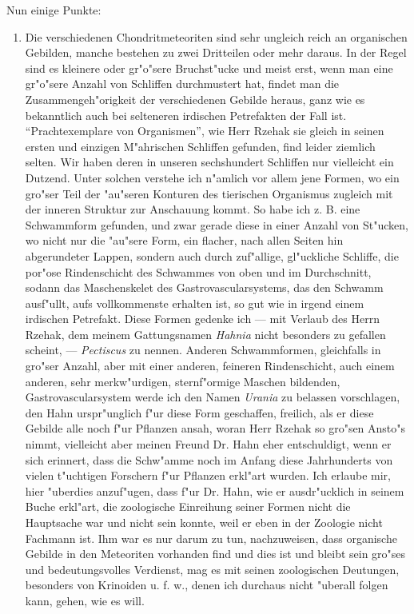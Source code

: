 \documentclass[a4paper, 12pt, oneside]{article}
\begin{document}
Nun einige Punkte:
\begin{enumerate}
    \item Die verschiedenen Chondritmeteoriten sind sehr ungleich reich an organischen Gebilden, manche bestehen zu zwei Dritteilen oder mehr daraus. In der Regel sind es kleinere oder gr"o"sere Bruchst"ucke und meist erst, wenn man eine gr"o"sere Anzahl von Schliffen durchmustert hat, findet man die Zusammengeh"origkeit der verschiedenen Gebilde heraus, ganz wie es bekanntlich auch bei selteneren irdischen Petrefakten der Fall ist. "`Prachtexemplare von Organismen"', wie Herr Rzehak sie gleich in seinen ersten und einzigen M"ahrischen Schliffen gefunden, find leider ziemlich selten. Wir haben deren in unseren sechshundert Schliffen nur vielleicht ein Dutzend. Unter solchen verstehe ich n"amlich vor allem jene Formen, wo ein gro"ser Teil der "au"seren Konturen des tierischen Organismus zugleich mit der inneren Struktur zur Anschauung kommt. So habe ich z. B. eine Schwammform gefunden, und zwar gerade diese in einer Anzahl von St"ucken, wo nicht nur die "au"sere Form, ein flacher, nach allen Seiten hin abgerundeter Lappen, sondern auch durch zuf"allige, gl"uckliche Schliffe, die por"ose Rindenschicht des Schwammes von oben und im Durchschnitt, sodann das Maschenskelet des Gastrovascularsystems, das den Schwamm ausf"ullt, aufs vollkommenste erhalten ist, so gut wie in irgend einem irdischen Petrefakt. Diese Formen gedenke ich --- mit Verlaub des Herrn Rzehak, dem meinem Gattungsnamen \emph{Hahnia} nicht besonders zu gefallen scheint, --- \emph{Pectiscus} zu nennen. Anderen Schwammformen, gleichfalls in gro"ser Anzahl, aber mit einer anderen, feineren Rindenschicht, auch einem anderen, sehr merkw"urdigen, sternf"ormige Maschen bildenden, Gastrovascularsystem werde ich den Namen \emph{Urania} zu belassen vorschlagen, den Hahn urspr"unglich f"ur diese Form geschaffen, freilich, als er diese Gebilde alle noch f"ur Pflanzen ansah, woran Herr Rzehak so gro"sen Ansto"s nimmt, vielleicht aber meinen Freund Dr. Hahn eher entschuldigt, wenn er sich erinnert, dass die Schw"amme noch im Anfang diese Jahrhunderts von vielen t"uchtigen Forschern f"ur Pflanzen erkl"art wurden. Ich erlaube mir, hier "uberdies anzuf"ugen, dass f"ur Dr. Hahn, wie er ausdr"ucklich in seinem Buche erkl"art, die zoologische Einreihung seiner Formen nicht die Hauptsache war und nicht sein konnte, weil er eben in der Zoologie nicht Fachmann ist. Ihm war es nur darum zu tun, nachzuweisen, dass organische Gebilde in den Meteoriten vorhanden find und dies ist und bleibt sein gro"ses und bedeutungsvolles Verdienst, mag es mit seinen zoologischen Deutungen, besonders von Krinoiden u. f. w., denen ich durchaus nicht "uberall folgen kann, gehen, wie es will.

\end{enumerate}
\end{document}
